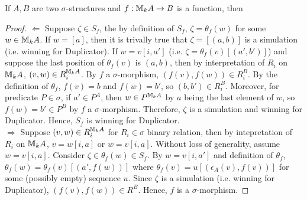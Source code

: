\begin{thm}
If $A,B$ are two $\sigma$-structures and $f:{\mathbb{M}_{k}A} \rightarrow B$ is a function, then 
\begin{proof}
$\Leftarrow$ Suppose $\zeta \in S_{f}$, the by definition of $S_{f}$, $\zeta = \theta_{f}(w)$ for some $w \in {\mathbb{M}_{k}A}$. If $w = [a]$, then it is trivally true that $\zeta = [(a,b)]$ is a simulation (i.e. winning for Duplicator). If $w = v[i,a']$ (i.e. $\zeta = \theta_{f}(v)[(a',b')]$) and suppose the last position of $\theta_{f}(v)$ is $(a,b)$, then by interpretation of $R_{i}$ on ${\mathbb{M}_{k}A}$, $(v,w) \in R_{i}^{{\mathbb{M}_{k}A}}$. By $f$ a $\sigma$-morphism, $(f(v),f(w)) \in R_{i}^{B}$. By the definition of $\theta_{f}$, $f(v) = b$ and $f(w) = b'$, so $(b,b') \in R_{i}^{B}$. Moreover, for predicate $P \in \sigma$, if $a' \in P^{A}$, then $w \in P^{{\mathbb{M}_{k}A}}$ by $a$ being the last element of $w$, so $f(w) = b' \in P^{B}$ by $f$ a $\sigma$-morphism. Therefore, $\zeta$ is a simulation and winning for Duplicator. Hence, $S_{f}$ is winning for Duplicator.\\
$\Rightarrow$ Suppose $(v,w) \in R_{i}^{{\mathbb{M}_{k}A}}$ for $R_{i} \in \sigma$ binary relation, then by intepretation of $R_{i}$ on ${\mathbb{M}_{k}A}$, $v = w[i,a]$ or $w = v[i,a]$. Without loss of generality, assume $w = v[i,a]$. Consider $\zeta \in \theta_{f}(w) \in S_{f}$. By $w = v[i,a']$ and definition of $\theta_{f}$, $\theta_{f}(w) = \theta_{f}(v)[(a',f(w))]$ where $\theta_{f}(v) = u[(\epsilon_{A}(v),f(v))]$ for some (possibly empty) sequence $u$. Since $\zeta$ is a simulation (i.e. winning for Duplicator), $(f(v),f(w)) \in R^{B}$. Hence, $f$ is a $\sigma$-morphism.
\end{proof}
\label{thm:toPositionalFormM}
\end{thm}
